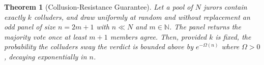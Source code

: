 \documentclass{article}
\newtheorem{theorem}{Theorem}[section]
\begin{document}







\begin{theorem}[Collusion-Resistance Guarantee]\label{thm:collusion}
Let a pool of $N$ jurors contain exactly $k$ colluders, and draw uniformly at random and without replacement an odd panel of size $n = 2m+1$ with $n \ll N$ and $m \in \mathbb{N}$. The panel returns the majority vote once at least $m+1$ members agree. Then, provided $k$ is fixed, the probability the colluders sway the verdict is bounded above by $e^{-\Omega(n)}$ where $\Omega > 0$, decaying exponentially in $n$.
\end{theorem}

\end{document}
